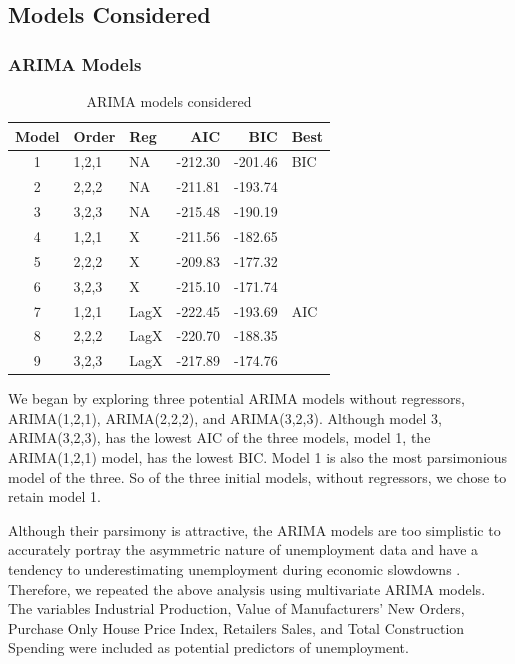 \documentclass[twoside,twocolumn]{article}
\begin{document}
\subsection{Models Considered}

\subsubsection{ARIMA Models}
\begin{table}[htb]
\centering
\caption{ARIMA models considered}
\label{tab:arimachoices}
\begin{tabular}{cllrrl}
  \hline
 Model & Order & Reg  & AIC & BIC & Best \\ 
  \hline
1 & 1,2,1 &  NA &   -212.30 & -201.46 & BIC \\ 
  2  & 2,2,2 & NA   & -211.81 & -193.74 &  \\ 
  3  & 3,2,3 &  NA  & -215.48 & -190.19 &  \\ 
  4  & 1,2,1 & X  & -211.56 & -182.65 &  \\ 
  5  & 2,2,2 & X   & -209.83 & -177.32 &  \\ 
  6  & 3,2,3 & X   & -215.10 & -171.74 &  \\ 
  7  & 1,2,1 &  LagX & -222.45 & -193.69 & AIC \\ 
  8  & 2,2,2 &  LagX & -220.70 & -188.35 &  \\ 
  9  & 3,2,3 &  LagX & -217.89 & -174.76 &  \\ 
   \hline
\end{tabular}
\end{table}

We began by exploring three potential ARIMA models without regressors, ARIMA(1,2,1), ARIMA(2,2,2), and ARIMA(3,2,3). Although model 3, ARIMA(3,2,3), has the lowest AIC of the three models, model 1, the ARIMA(1,2,1) model, has the lowest BIC. Model 1 is also the most parsimonious model of the three. So of the three initial models, without regressors, we chose to retain model 1.  

Although their parsimony is attractive, the ARIMA models are too simplistic to accurately portray the asymmetric nature of unemployment data and have a tendency to underestimating unemployment during economic slowdowns \citep{Montgomery1998}. Therefore, we repeated the above analysis using multivariate ARIMA models.  The variables Industrial Production, Value of Manufacturers' New Orders, Purchase Only House Price Index,  Retailers Sales, and Total Construction Spending were included as potential predictors of unemployment. 
\end{document}
